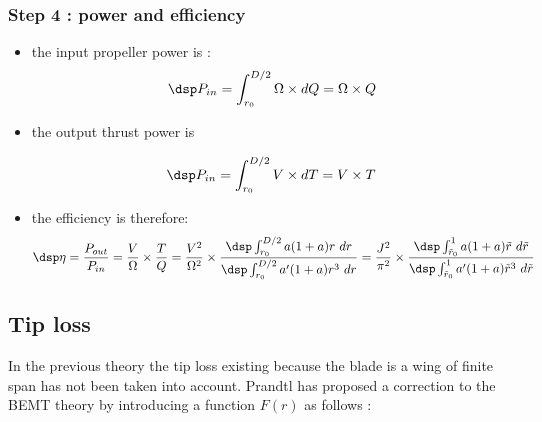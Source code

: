 \subsubsection{\sc Step 4 : power and efficiency}

\begin{itemize}
  \item the input propeller power is :
  $$ \dsp
  P_{in}  = \int_{r_0}^{D/2} \Omega\times dQ = \Omega \times Q 
  $$
  
  
  \item the output thrust power is 
    
  $$ \dsp
  P_{in}   = \int_{r_0}^{D/2} V \times dT = V \times T
  $$
  
  \item the efficiency is therefore:
  $$\dsp
  \eta = \frac{P_{out}}{P_{in}} = \frac{V}{\Omega} \times \frac{T}{Q} = \frac{V^2}{\Omega^2} \times
  \frac{\dsp \int_{r_0}^{D/2}  a (1+a) r~dr }{\dsp \int_{r_0}^{D/2} a'(1+a)r^3~dr} =
  \frac{J^2}{\pi^2} \times
  \frac{\dsp \int_{\tilde r_0}^{1}  a (1+a) \tilde r~d\tilde r }{\dsp \int_{\tilde r_0}^{1} a'(1+a)\tilde r^3~d\tilde r}
  $$
  \end{itemize}
  


\subsection{Tip loss}

In the previous theory the tip loss existing because the blade is a wing of finite span has not been taken
into account. Prandtl has proposed a correction  to the BEMT theory by introducing a function $F(r)$ as follows :

